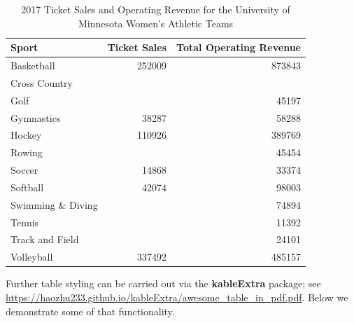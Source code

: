 \documentclass[12pt,letterpaper,oneside,oldfontcommands]{memoir}
\newenvironment{Shaded}{\begin{snugshade}}{\end{snugshade}}
\newcommand{\DataTypeTok}[1]{\textcolor[rgb]{0.13,0.29,0.53}{#1}}
\newcommand{\KeywordTok}[1]{\textcolor[rgb]{0.13,0.29,0.53}{\textbf{#1}}}
\newcommand{\NormalTok}[1]{#1}
\newcommand{\OperatorTok}[1]{\textcolor[rgb]{0.81,0.36,0.00}{\textbf{#1}}}
\newcommand{\OtherTok}[1]{\textcolor[rgb]{0.56,0.35,0.01}{#1}}
\newcommand{\StringTok}[1]{\textcolor[rgb]{0.31,0.60,0.02}{#1}}
\theoremstyle{definition}
\theoremstyle{definition}
\theoremstyle{definition}
\theoremstyle{remark}
\begin{document}
\begin{table}

\caption{\label{tab:nice-tab}2017 Ticket Sales and Operating Revenue for the University of Minnesota Women's Athletic Teams}
\centering
\begin{tabular}[t]{lrr}
\toprule
Sport & Ticket Sales & Total Operating Revenue\\
\midrule
Basketball & 252009 & 873843\\
Cross Country &  & \\
Golf &  & 45197\\
Gymnastics & 38287 & 58288\\
Hockey & 110926 & 389769\\
\addlinespace
Rowing &  & 45454\\
Soccer & 14868 & 33374\\
Softball & 42074 & 98003\\
Swimming \& Diving &  & 74894\\
Tennis &  & 11392\\
\addlinespace
Track and Field &  & 24101\\
Volleyball & 337492 & 485157\\
\bottomrule
\end{tabular}
\end{table}

Further table styling can be carried out via the \textbf{kableExtra}
package; see
\url{https://haozhu233.github.io/kableExtra/awesome_table_in_pdf.pdf}.
Below we demonstrate some of that functionality.

\begin{Shaded}
\end{Shaded}
\end{document}
